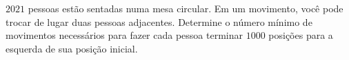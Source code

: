 $2021$ pessoas estão sentadas numa mesa circular.
Em um movimento, você pode trocar de lugar duas pessoas adjacentes.
Determine o número mínimo de movimentos necessários para fazer cada pessoa terminar \(1000\) posições para a esquerda de sua posição inicial.

